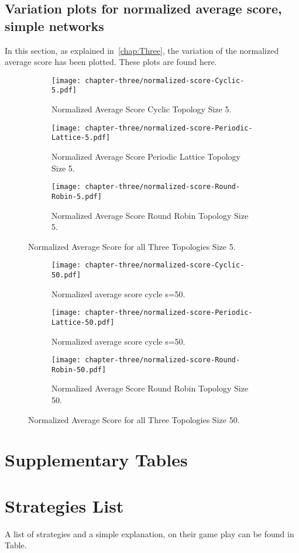\subsection{Variation plots for normalized average score, simple networks}
\label{append:variation-plots}
In this section, as explained in~\ref{chap:Three}, the variation of the
normalized average score has been plotted. These plots are found here.

\begin{figure}[h]
\centering
    \begin{subfigure}[t]{0.8\textwidth}
    \centering
        \texttt{[image: chapter-three/normalized-score-Cyclic-5.pdf]}
    \caption{Normalized Average Score Cyclic Topology Size 5.}
    \end{subfigure}
\hfill
    \begin{subfigure}[t]{0.8\textwidth}\centering
    \centering
        \texttt{[image: chapter-three/normalized-score-Periodic-Lattice-5.pdf]}
    \caption{Normalized Average Score Periodic Lattice Topology Size 5.}
    \end{subfigure}
\hfill
    \begin{subfigure}[t]{0.8\textwidth}\centering
    \centering
        \texttt{[image: chapter-three/normalized-score-Round-Robin-5.pdf]}
    \caption{Normalized Average Score Round Robin Topology Size 5.}
    \end{subfigure}
\caption{Normalized Average Score for all Three Topologies Size 5.}
\label{fig:average-score-five}
\end{figure}

\begin{figure}[h]
\centering
    \begin{subfigure}[t]{1\textwidth}
    \centering
        \texttt{[image: chapter-three/normalized-score-Cyclic-50.pdf]}
    \caption{Normalized average score cycle s=50.}
    \end{subfigure}
\hfill
    \begin{subfigure}[t]{1\textwidth}\centering
    \centering
        \texttt{[image: chapter-three/normalized-score-Periodic-Lattice-50.pdf]}
    \caption{Normalized average score cycle s=50.}
    \end{subfigure}
\hfill
    \begin{subfigure}[t]{1\textwidth}\centering
    \centering
        \texttt{[image: chapter-three/normalized-score-Round-Robin-50.pdf]}
    \caption{Normalized Average Score Round Robin Topology Size 50.}
    \end{subfigure}
\caption{Normalized Average Score for all Three Topologies Size 50.}
\label{fig:average-score-fifty}
\end{figure}

\section{Supplementary Tables}
\section{Strategies List}
\label{append:strategies}
A list of strategies and a simple explanation, on their game play can be found in
Table.
